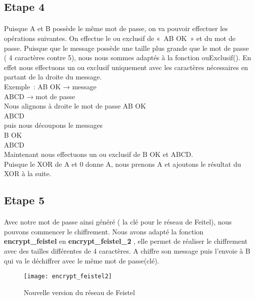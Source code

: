 \documentclass[11pt,fleqn]{book} %
\begin{document}
\subsection{Etape 4}
\paragraph{}Puisque A et B possède le même mot de passe, on va pouvoir effectuer les opérations suivantes. On effectue le ou exclusif de « AB OK » et du mot de passe. Puisque que le message possède une taille plus grande que le mot de passe ( 4 caractères contre 5), nous nous sommes adaptés à la fonction ouExclusif(). En effet nous effectuons un ou exclusif uniquement avec les caractères nécessaires en partant de la droite du message. \\Exemple :
\vspace{0.5cm}AB OK → message
\\ABCD → mot de passe
\\Nous alignons à droite le mot de passe
\vspace{0.5cm}AB OK
\\ABCD
\\puis nous découpons le messages
\\B OK
\\ABCD
\\Maintenant nous effectuons un ou exclusif de B OK et ABCD.
\\Puisque le XOR de A et 0 donne A, nous prenons A et ajoutons le résultat du XOR à la suite.

\subsection{Etape 5}
\paragraph{}Avec notre mot de passe ainsi généré ( la clé pour le réseau de Feitel), nous pouvons commencer le chiffrement. Nous avons adapté la fonction \textbf{encrypt\_feistel} en \textbf{encrypt\_feistel\_2}  , elle permet de réaliser le chiffrement avec des tailles différentes de 4 caractères. A chiffre son message puis l'envoie à B qui va le déchiffrer avec le même mot de passe(clé). 

\begin{figure}[h]
\centering\texttt{[image: encrypt\_feistel2]}
\caption{Nouvelle version du réseau de Feistel}
\end{figure}
\end{document}
